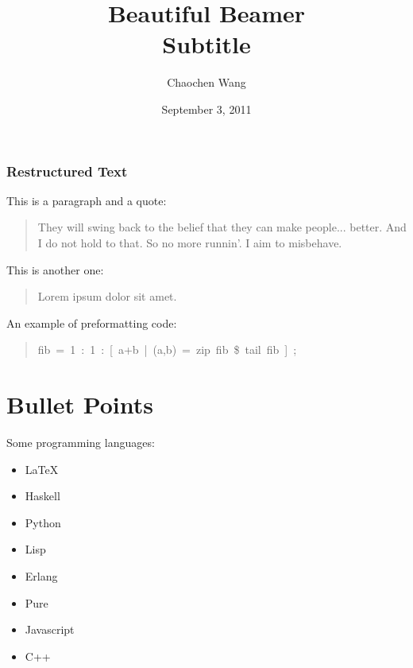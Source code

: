 \documentclass[t,english]{beamer}
\begin{document}
\title[Beautiful Beamer]{Beautiful Beamer%
  \label{beautiful-beamer}%
  \\ %
  \large{Subtitle}%
  \label{subtitle}}
\author[Chaohchen Wang]{Chaochen Wang}
\date{September 3, 2011}
\maketitle

\begin{frame}[fragile]
\frametitle{Restructured Text}


This is a paragraph and a quote:
%
\begin{quote}

They will swing back to the belief that they can make people... better. And I do not hold to that. So no more runnin'. I aim to misbehave.

\end{quote}

This is another one:
%
\begin{quote}

Lorem ipsum dolor sit amet.

\end{quote}

An example of preformatting code:
%
\begin{quote}{\ttfamily \raggedright \noindent
fib~=~1~:~1~:~{[}~a+b~|~(a,b)~=~zip~fib~\$~tail~fib~{]}~;
}
\end{quote}

\end{frame}



\section*{Bullet Points}

Some programming languages:
\begin{itemize}

\item LaTeX

\item Haskell

\item Python

\item Lisp

\item Erlang

\item Pure

\item Javascript

\item C++
\end{itemize}
\end{document}
